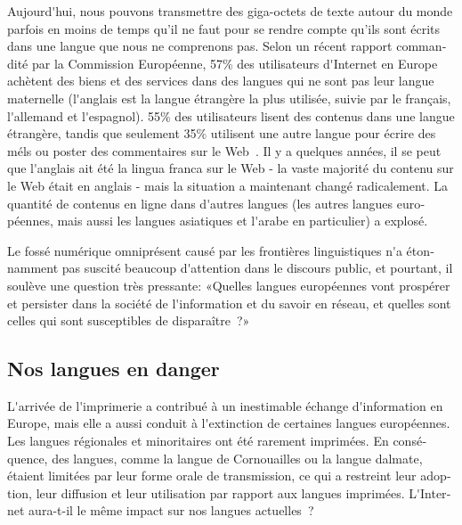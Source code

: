 \begin{french}
\begin{multicols}{2}

Aujourd{\mbox '}hui, nous pouvons transmettre des giga-octets de texte
autour du monde parfois en moins de temps qu'il ne faut pour se rendre
compte qu'ils sont écrits dans une langue que nous ne comprenons pas.
Selon un récent rapport commandité par la Commission Européenne, 57\%
des utilisateurs d{\mbox '}Internet en Europe achètent des biens et
des services dans des langues qui ne sont pas leur langue maternelle
(l{\mbox '}anglais est la langue étrangère la plus utilisée, suivie
par le français, l{\mbox '}allemand et l{\mbox '}espagnol). 55\% des
utilisateurs lisent des contenus dans une langue étrangère, tandis que
seulement 35\% utilisent une autre langue pour écrire des méls ou
poster des commentaires sur le Web~\cite{Eurobarometer313}. Il y a
quelques années, il se peut que l{\mbox '}anglais ait été la lingua
franca sur le Web - la vaste majorité du contenu sur le Web était en
anglais - mais la situation a maintenant changé radicalement. La
quantité de contenus en ligne dans d{\mbox '}autres langues (les
autres langues européennes, mais aussi les langues asiatiques et
l{\mbox '}arabe en particulier) a explosé.


Le fossé numérique omniprésent causé par les frontières linguistiques
n{\mbox '}a étonnamment pas suscité beaucoup d{\mbox '}attention dans
le discours public, et pourtant, il soulève une question très
pressante: «Quelles langues européennes vont prospérer et persister
  dans la société de l{\mbox '}information et du savoir en réseau, et
  quelles sont celles qui sont susceptibles de disparaître~?»

\subsection{Nos langues en danger}

L{\mbox '}arrivée de l{\mbox '}imprimerie a contribué à un inestimable
échange d{\mbox '}information en Europe, mais elle a aussi conduit à
l{\mbox '}extinction de certaines langues européennes. Les langues
régionales et minoritaires ont été rarement imprimées. En conséquence,
des langues, comme la langue de Cornouailles ou la langue dalmate,
étaient limitées par leur forme orale de transmission, ce qui a
restreint leur adoption, leur diffusion et leur utilisation par
rapport aux langues imprimées. L{\mbox '}Internet aura-t-il le même
impact sur nos langues actuelles~?


\end{multicols}
\end{french}
